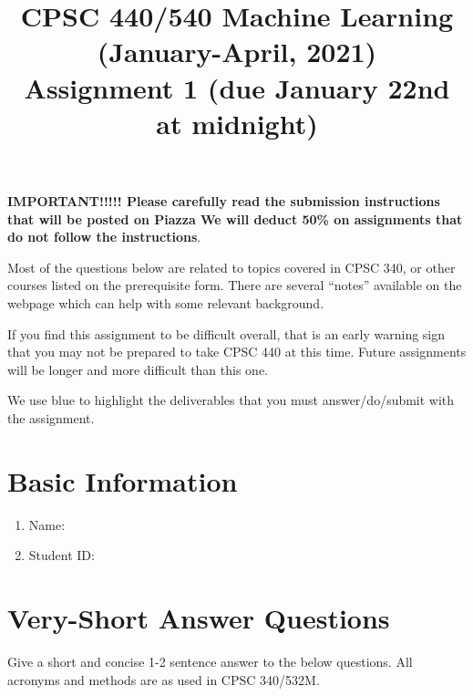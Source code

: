 \documentclass{article}
\def\blu#1{{\color{blu}#1}}
\def\enum#1{\begin{enumerate}#1\end{enumerate}}
\begin{document}
\title{CPSC 440/540 Machine Learning (January-April, 2021)\\Assignment 1 (due January 22nd at midnight)}
\author{}
\date{}
\maketitle
\vspace{-4em}


\textbf{IMPORTANT!!!!! Please carefully read the submission instructions that will be posted on Piazza We will deduct 50\% on assignments that do not follow the instructions}.

Most of the questions below are related to topics covered in CPSC 340, or other courses listed on the prerequisite form. There are several ``notes'' available on the webpage which can help with some relevant background.

If you find this assignment to be difficult overall, that is an early warning sign that you may not be prepared to take CPSC 440
at this time. Future assignments will be longer and more difficult than this one.

We use \blu{blue} to highlight the deliverables that you must answer/do/submit with the assignment.

\section*{Basic Information}


\blu{\enum{
\item Name:
\item Student ID:
}}


\section{Very-Short Answer Questions}


Give a short and concise 1-2 sentence answer to the below questions. All acronyms and methods are as used in CPSC 340/532M.
\end{document}
